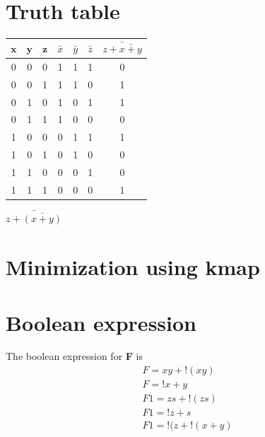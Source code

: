 \documentclass[journal,10pt]{article}
\begin{document}
\section{\large Truth table}
{
\centering
\begin{tabular}{|c|c|c|c|c|c|c|}
\hline
$\boldsymbol{x}$&$\boldsymbol{y}$&$\boldsymbol{z}$&$\bar{x}$&$\bar{y}$&$\bar{z}$&$\bar{z+ \bar{x+y}}$\\
\hline
0&0&0&1&1&1&0\\
\hline
0&0&1&1&1&0&1\\
\hline
0&1&0&1&0&1&1\\
\hline
0&1&1&1&0&0&0\\
\hline
1&0&0&0&1&1&1\\
\hline
1&0&1&0&1&0&0\\
\hline
1&1&0&0&0&1&0\\
\hline
1&1&1&0&0&0&1\\
\hline
\end{tabular}
}
$\bar{z+ \bar{(x+y)}}$
\section*{\large Minimization using kmap}
\begin{kvmap}
\end{kvmap}

\section*{\large Boolean expression}
The boolean expression for \textbf{F} is
\begin{align*}%
&F=xy+!(xy)\\
&F=!{x+y}\\
&F1=zs+!(zs)\\
&F1=!{z+s}\\
&F1=!{(z+!(x+y)}\\
\end{align*}
\end{document}
